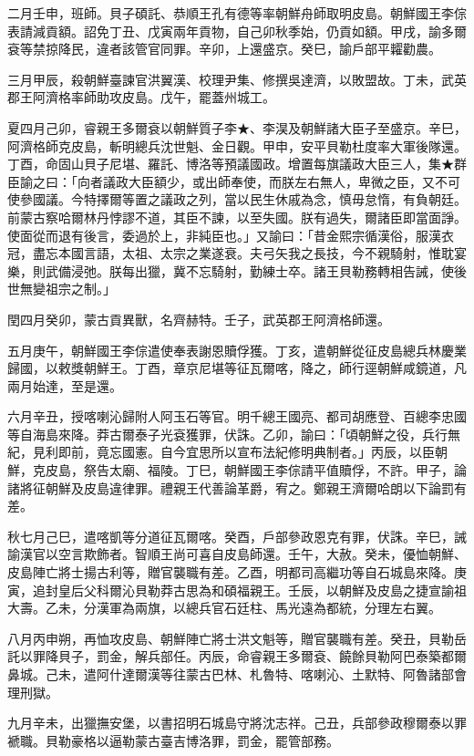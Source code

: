\begin{pinyinscope}
二月壬申，班師。貝子碩託、恭順王孔有德等率朝鮮舟師取明皮島。朝鮮國王李倧表請減貢額。詔免丁丑、戊寅兩年貢物，自己卯秋季始，仍貢如額。甲戌，諭多爾袞等禁掠降民，違者該管官同罪。辛卯，上還盛京。癸巳，諭戶部平糶勸農。

三月甲辰，殺朝鮮臺諫官洪翼漢、校理尹集、修撰吳達濟，以敗盟故。丁未，武英郡王阿濟格率師助攻皮島。戊午，罷蓋州城工。

夏四月己卯，睿親王多爾袞以朝鮮質子李★、李淏及朝鮮諸大臣子至盛京。辛巳，阿濟格師克皮島，斬明總兵沈世魁、金日觀。甲申，安平貝勒杜度率大軍後隊還。丁酉，命固山貝子尼堪、羅託、博洛等預議國政。增置每旗議政大臣三人，集★群臣諭之曰：「向者議政大臣額少，或出師奉使，而朕左右無人，卑微之臣，又不可使參國議。今特擇爾等置之議政之列，當以民生休戚為念，慎毋怠惰，有負朝廷。前蒙古察哈爾林丹悖謬不道，其臣不諫，以至失國。朕有過失，爾諸臣即當面諍。使面從而退有後言，委過於上，非純臣也。」又諭曰：「昔金熙宗循漢俗，服漢衣冠，盡忘本國言語，太祖、太宗之業遂衰。夫弓矢我之長技，今不親騎射，惟耽宴樂，則武備浸弛。朕每出獵，冀不忘騎射，勤練士卒。諸王貝勒務轉相告誡，使後世無變祖宗之制。」

閏四月癸卯，蒙古貢異獸，名齊赫特。壬子，武英郡王阿濟格師還。

五月庚午，朝鮮國王李倧遣使奉表謝恩贖俘獲。丁亥，遣朝鮮從征皮島總兵林慶業歸國，以敕獎朝鮮王。丁酉，章京尼堪等征瓦爾喀，降之，師行逕朝鮮咸鏡道，凡兩月始達，至是還。

六月辛丑，授喀喇沁歸附人阿玉石等官。明千總王國亮、都司胡應登、百總李忠國等自海島來降。莽古爾泰子光袞獲罪，伏誅。乙卯，諭曰：「頃朝鮮之役，兵行無紀，見利即前，竟忘國憲。自今宜思所以宣布法紀修明典制者。」丙辰，以臣朝鮮，克皮島，祭告太廟、福陵。丁巳，朝鮮國王李倧請平值贖俘，不許。甲子，論諸將征朝鮮及皮島違律罪。禮親王代善論革爵，宥之。鄭親王濟爾哈朗以下論罰有差。

秋七月己巳，遣喀凱等分道征瓦爾喀。癸酉，戶部參政恩克有罪，伏誅。辛巳，誡諭漢官以空言欺飾者。智順王尚可喜自皮島師還。壬午，大赦。癸未，優恤朝鮮、皮島陣亡將士揚古利等，贈官襲職有差。乙酉，明都司高繼功等自石城島來降。庚寅，追封皇后父科爾沁貝勒莽古思為和碩福親王。壬辰，以朝鮮及皮島之捷宣諭祖大壽。乙未，分漢軍為兩旗，以總兵官石廷柱、馬光遠為都統，分理左右翼。

八月丙申朔，再恤攻皮島、朝鮮陣亡將士洪文魁等，贈官襲職有差。癸丑，貝勒岳託以罪降貝子，罰金，解兵部任。丙辰，命睿親王多爾袞、饒餘貝勒阿巴泰築都爾鼻城。己未，遣阿什達爾漢等往蒙古巴林、札魯特、喀喇沁、土默特、阿魯諸部會理刑獄。

九月辛未，出獵撫安堡，以書招明石城島守將沈志祥。己丑，兵部參政穆爾泰以罪褫職。貝勒豪格以逼勒蒙古臺吉博洛罪，罰金，罷管部務。


\end{pinyinscope}
